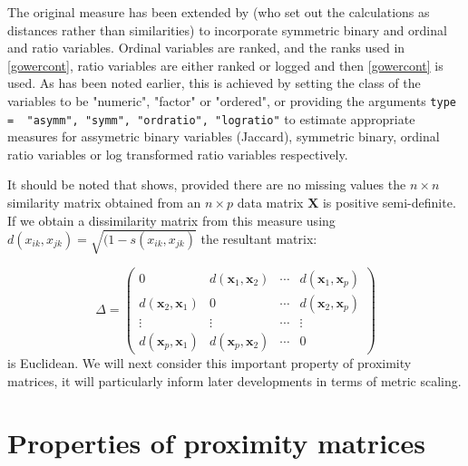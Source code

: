 The original measure has been extended by \cite{Kaufman+Rousseeuw:1989} (who set out the calculations as distances rather than similarities) to incorporate symmetric binary and ordinal and ratio variables.   Ordinal variables are ranked, and the ranks used in \ref{gowercont}, ratio variables are either ranked or logged and then \ref{gowercont} is used.   As has been noted earlier, this is achieved by setting the class of the variables to be "numeric", "factor" or "ordered", or providing the arguments \verb+type =  "asymm", "symm", "ordratio", "logratio"+ to estimate appropriate measures for assymetric binary variables (Jaccard), symmetric binary, ordinal ratio variables or log transformed ratio variables respectively.

It should be noted that \cite{Gower:1971} shows, provided there are no missing values the $n \times n$ similarity matrix obtained from an $n \times p$ data matrix $\boldsymbol{X}$ is positive semi-definite.   If we obtain a dissimilarity matrix from this measure using $d(x_{ik},x_{jk}) = \sqrt{(1 - s(x_{ik},x_{jk})}$ the resultant matrix:

\begin{displaymath}
\Delta = \left( \begin{array}{rrrr} 
0 & d(\boldsymbol{x}_{1},\boldsymbol{x}_{2}) & \cdots & d(\boldsymbol{x}_{1},\boldsymbol{x}_{p})\\
d(\boldsymbol{x}_{2},\boldsymbol{x}_{1}) & 0  & \cdots & d(\boldsymbol{x}_{2},\boldsymbol{x}_{p})\\
\vdots & \vdots & \cdots & \vdots \\
d(\boldsymbol{x}_{p},\boldsymbol{x}_{1})  & d(\boldsymbol{x}_{p},\boldsymbol{x}_{2}) & \cdots  & 0 \end{array} \right)
\end{displaymath}
is Euclidean.   We will next consider this important property of proximity matrices, it will particularly inform later developments in terms of metric scaling.

\section{Properties of proximity matrices}

